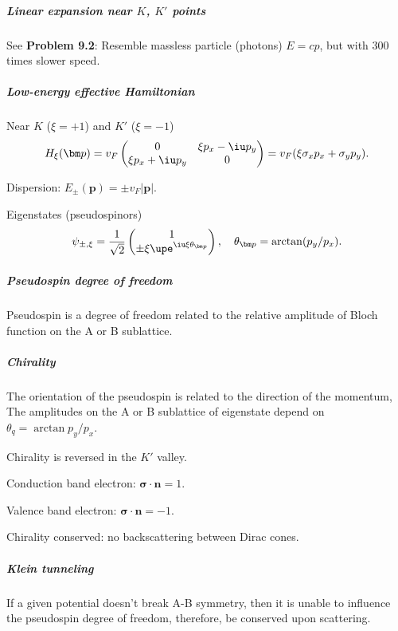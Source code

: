 \subparagraph{Linear expansion near $K$, $K'$ points}\leavevmode

See \textbf{Problem 9.2}: Resemble massless particle (photons) $E = cp$,
but with 300 times slower speed.

\subparagraph{Low-energy effective Hamiltonian}

\begin{enumext}
  \item Near $K$ ($\xi=+1$) and $K'$ ($\xi=-1$)
    \[
      H_\xi(\bm p) = v_F \begin{pmatrix}
        0 & \xi p_x - \iu p_y\\
        \xi p_x + \iu p_y & 0
      \end{pmatrix}
      = v_F (\xi \sigma_x p_x + \sigma_y p_y).
    \]
  \item Dispersion: $E_{\pm}(\bm p) = \pm v_F |\bm p|$.
  \item Eigenstates (pseudospinors)
    \[
      \psi_{\pm,\xi} = \frac{1}{\sqrt2} \begin{pmatrix}
        1\\
        \pm \xi \upe^{\iu \xi \theta_{\bm p}}
      \end{pmatrix}, \quad
      \theta_{\bm p} = \arctan(p_y/p_x).
    \]
\end{enumext}

\subparagraph{Pseudospin degree of freedom}

Pseudospin is a degree of freedom related to the relative amplitude of Bloch
function on the A or B sublattice.

\subparagraph{Chirality}

The orientation of the pseudospin is related to the direction of the momentum,
The amplitudes on the A or B sublattice of eigenstate depend
on $\theta_q = \arctan p_y/p_x$.

Chirality is reversed in the $K'$ valley.
\begin{enumext}
  \item Conduction band electron: $\bm \sigma \cdot \bm n = 1$.
  \item Valence band electron: $\bm \sigma \cdot \bm n = -1$.
\end{enumext}
Chirality conserved: no backscattering between Dirac cones.

\subparagraph{Klein tunneling}

If a given potential doesn't break A-B symmetry, then it is unable to
influence the pseudospin degree of freedom, therefore, be conserved upon
scattering.

